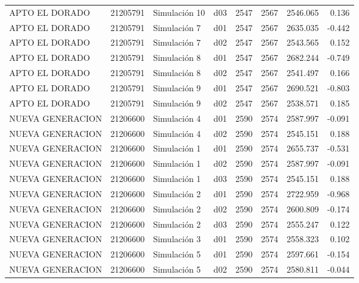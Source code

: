\begin{landscape}
\begin{longtable}{lrlp{2cm}p{2cm}p{3cm}p{2cm}r}
          APTO EL DORADO &  21205791 &  Simulación 10 &   d03 &      2547 &     2567 &  2546.065 &     0.136 \\
          APTO EL DORADO &  21205791 &   Simulación 7 &   d01 &      2547 &     2567 &  2635.035 &    -0.442 \\
          APTO EL DORADO &  21205791 &   Simulación 7 &   d02 &      2547 &     2567 &  2543.565 &     0.152 \\
          APTO EL DORADO &  21205791 &   Simulación 8 &   d01 &      2547 &     2567 &  2682.244 &    -0.749 \\
          APTO EL DORADO &  21205791 &   Simulación 8 &   d02 &      2547 &     2567 &  2541.497 &     0.166 \\
          APTO EL DORADO &  21205791 &   Simulación 9 &   d01 &      2547 &     2567 &  2690.521 &    -0.803 \\
          APTO EL DORADO &  21205791 &   Simulación 9 &   d02 &      2547 &     2567 &  2538.571 &     0.185 \\
        NUEVA GENERACION &  21206600 &   Simulación 4 &   d01 &      2590 &     2574 &  2587.997 &    -0.091 \\
        NUEVA GENERACION &  21206600 &   Simulación 4 &   d02 &      2590 &     2574 &  2545.151 &     0.188 \\
        NUEVA GENERACION &  21206600 &   Simulación 1 &   d01 &      2590 &     2574 &  2655.737 &    -0.531 \\
        NUEVA GENERACION &  21206600 &   Simulación 1 &   d02 &      2590 &     2574 &  2587.997 &    -0.091 \\
        NUEVA GENERACION &  21206600 &   Simulación 1 &   d03 &      2590 &     2574 &  2545.151 &     0.188 \\
        NUEVA GENERACION &  21206600 &   Simulación 2 &   d01 &      2590 &     2574 &  2722.959 &    -0.968 \\
        NUEVA GENERACION &  21206600 &   Simulación 2 &   d02 &      2590 &     2574 &  2600.809 &    -0.174 \\
        NUEVA GENERACION &  21206600 &   Simulación 2 &   d03 &      2590 &     2574 &  2555.247 &     0.122 \\
        NUEVA GENERACION &  21206600 &   Simulación 3 &   d01 &      2590 &     2574 &  2558.323 &     0.102 \\
        NUEVA GENERACION &  21206600 &   Simulación 5 &   d01 &      2590 &     2574 &  2597.661 &    -0.154 \\
        NUEVA GENERACION &  21206600 &   Simulación 5 &   d02 &      2590 &     2574 &  2580.811 &    -0.044 \\

\end{longtable}
\end{landscape}
